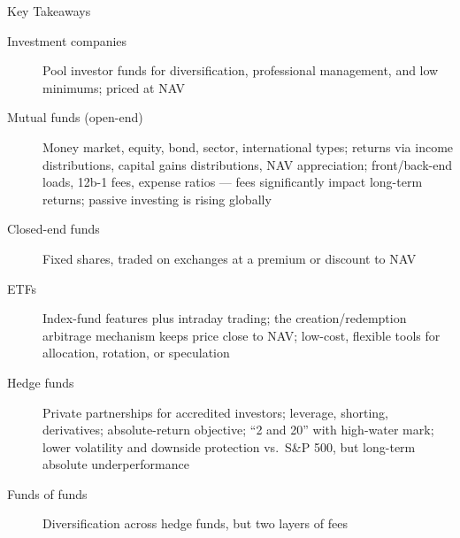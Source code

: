 \documentclass[aspectratio=169]{beamer}
\begin{document}
\begin{frame}{Key Takeaways}
\begin{description}
  \item[Investment companies] Pool investor funds for diversification, professional management, and low minimums; priced at NAV
  \item[Mutual funds (open-end)] Money market, equity, bond, sector, international types; returns via income distributions, capital gains distributions, NAV appreciation; front/back-end loads, 12b-1 fees, expense ratios --- fees significantly impact long-term returns; passive investing is rising globally
  \item[Closed-end funds] Fixed shares, traded on exchanges at a premium or discount to NAV
  \item[ETFs] Index-fund features plus intraday trading; the creation/redemption arbitrage mechanism keeps price close to NAV; low-cost, flexible tools for allocation, rotation, or speculation
  \item[Hedge funds] Private partnerships for accredited investors; leverage, shorting, derivatives; absolute-return objective; ``2 and 20'' with high-water mark; lower volatility and downside protection vs.\ S\&P 500, but long-term absolute underperformance
  \item[Funds of funds] Diversification across hedge funds, but two layers of fees
\end{description}
\end{frame}
\end{document}
